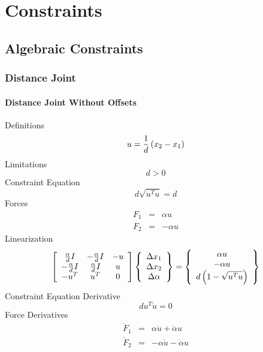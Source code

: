 \documentclass[10pt,dvips]{report}
\begin{document}
\chapter{Constraints}

\section{Algebraic Constraints}

\subsection{Distance Joint}

\subsubsection{Distance Joint Without Offsets}
Definitions
\begin{displaymath}
	u = \frac{1}{d}\plbr{x_2 - x_1}
\end{displaymath}
Limitations
\begin{displaymath}
	d > 0
\end{displaymath}
Constraint Equation
\begin{displaymath}
	d \sqrt{u^T u} = d
\end{displaymath}
Forces
\begin{eqnarray*}
	F_1 & = & \alpha u \\
	F_2 & = & -\alpha u
\end{eqnarray*}
Linearization
\begin{displaymath}
	\sqbr{\matr{ccc}{
		\frac{\alpha}{d}I & -\frac{\alpha}{d}I & -u \\
		-\frac{\alpha}{d}I & \frac{\alpha}{d}I & u \\
		-u^T & u^T & 0
	}}\cubr{\cvvect{
		\Delta{x_1} \\
		\Delta{x_2} \\
		\Delta{\alpha}
	}} = \cubr{\cvvect{
		\alpha u \\
		- \alpha u \\
		d\plbr{1 - \sqrt{u^T u}}
	}}
\end{displaymath}
Constraint Equation Derivative
\begin{displaymath}
	d u^T \dot{u} = 0
\end{displaymath}
Force Derivatives
\begin{eqnarray*}
	\dot{F}_1 & = & \alpha \dot{u} + \dot{\alpha} u \\
	\dot{F}_2 & = & -\alpha \dot{u} - \dot{\alpha} u
\end{eqnarray*}
\end{document}
